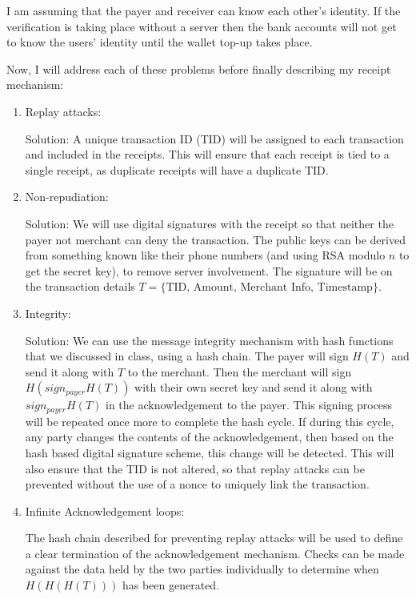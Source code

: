 \documentclass{ashoka-crypto}
\begin{document}
I am assuming that the payer and receiver can know each other's identity. If the verification is taking place without a server then the bank accounts will not get to know the users' identity until the wallet top-up takes place.

Now, I will address each of these problems before finally describing my receipt mechanism:
\begin{enumerate}
\item Replay attacks:

Solution: A unique transaction ID (TID) will be assigned to each transaction and included in the receipts. This will ensure that each receipt is tied to a single receipt, as duplicate receipts will have a duplicate TID.

\item Non-repudiation:

Solution: We will use digital signatures with the receipt so that neither the payer not merchant can deny the transaction. The public keys can be derived from something known like their phone numbers (and using RSA modulo $n$ to get the secret key), to remove server involvement. The signature will be on the transaction details $T = \{\text{TID, Amount, Merchant Info, Timestamp}\}$.

\item Integrity:

Solution: We can use the message integrity mechanism with hash functions that we discussed in class, using a hash chain. The payer will sign $H(T)$ and send it along with $T$ to the merchant. Then the merchant will sign $H(sign_{payer}H(T))$ with their own secret key and send it along with $sign_{payer}H(T)$ in the acknowledgement to the payer. This signing process will be repeated once more to complete the hash cycle. If during this cycle, any party changes the contents of the acknowledgement, then based on the hash based digital signature scheme, this change will be detected. This will also ensure that the TID is not altered, so that replay attacks can be prevented without the use of a nonce to uniquely link the transaction.

\item Infinite Acknowledgement loops:

The hash chain described for preventing replay attacks will be used to define a clear termination of the acknowledgement mechanism. Checks can be made against the data held by the two parties individually to determine when $H(H(H(T)))$ has been generated.
\end{enumerate}
\end{document}
